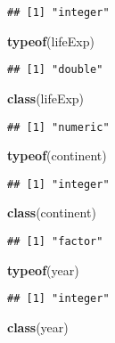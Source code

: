 \documentclass[]{article}
\newenvironment{Shaded}{\begin{snugshade}}{\end{snugshade}}
\newcommand{\KeywordTok}[1]{\textcolor[rgb]{0.13,0.29,0.53}{\textbf{#1}}}
\newcommand{\NormalTok}[1]{#1}
\begin{document}
\begin{verbatim}
## [1] "integer"
\end{verbatim}

\begin{Shaded}
\begin{Highlighting}[]
\KeywordTok{typeof}\NormalTok{(lifeExp)}
\end{Highlighting}
\end{Shaded}

\begin{verbatim}
## [1] "double"
\end{verbatim}

\begin{Shaded}
\begin{Highlighting}[]
\KeywordTok{class}\NormalTok{(lifeExp)}
\end{Highlighting}
\end{Shaded}

\begin{verbatim}
## [1] "numeric"
\end{verbatim}

\begin{Shaded}
\begin{Highlighting}[]
\KeywordTok{typeof}\NormalTok{(continent)}
\end{Highlighting}
\end{Shaded}

\begin{verbatim}
## [1] "integer"
\end{verbatim}

\begin{Shaded}
\begin{Highlighting}[]
\KeywordTok{class}\NormalTok{(continent)}
\end{Highlighting}
\end{Shaded}

\begin{verbatim}
## [1] "factor"
\end{verbatim}

\begin{Shaded}
\begin{Highlighting}[]
\KeywordTok{typeof}\NormalTok{(year)}
\end{Highlighting}
\end{Shaded}

\begin{verbatim}
## [1] "integer"
\end{verbatim}

\begin{Shaded}
\begin{Highlighting}[]
\KeywordTok{class}\NormalTok{(year)}
\end{Highlighting}
\end{Shaded}
\end{document}
